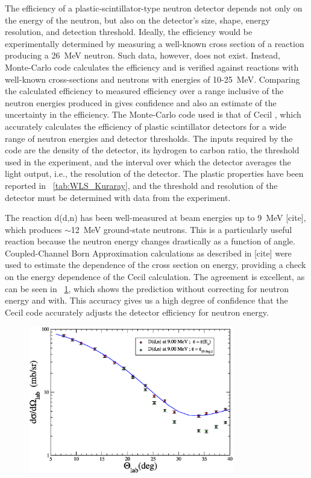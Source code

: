 The efficiency of a plastic-scintillator-type neutron detector depends not only on the energy of the neutron, but also on the detector's size, shape, energy resolution, and detection threshold.  Ideally, the efficiency would be experimentally determined by measuring a well-known cross section of a reaction producing a 26~MeV neutron.  Such data, however, does not exist.  Instead, Monte-Carlo code calculates the efficiency and is verified against reactions with well-known cross-sections and neutrons with energies of 10-25~MeV.  Comparing the calculated efficiency to measured efficiency over a range inclusive of the neutron energies produced in \reaction gives confidence and also an estimate of the uncertainty in the efficiency.  The Monte-Carlo code used is that of Cecil \cite{Cecil_neutEfficiency}, which accurately calculates the efficiency of plastic scintillator detectors for a wide range of neutron energies and detector thresholds.  The inputs required by the code are the density of the detector, its hydrogen to carbon ratio, the threshold used in the experiment, and the interval over which the detector averages the light output, i.e., the resolution of the detector.  The plastic properties have been reported in {\tab}~\ref{tab:WLS_Kuraray}, and the threshold and resolution of the detector must be determined with data from the experiment.  

The reaction d(d,n) has been well-measured at beam energies up to 9~MeV [cite], which produces $\sim$12~MeV ground-state neutrons.  This is a particularly useful reaction because the neutron energy changes drastically as a function of angle.  Coupled-Channel Born Approximation calculations as described in [cite] were used to estimate the dependence of the cross section on energy, providing a check on the energy dependence of the Cecil calculation.  The agreement is excellent, as can be seen in {\fig}~\ref{fig:DeuteriumMatch}, which shows the prediction without correcting for neutron energy and with.  This accuracy gives us a high degree of confidence that the Cecil code accurately adjusts the detector efficiency for neutron energy.  
\begin{figure}[!htbp]
\centering
\includegraphics[width=0.8\textwidth]{figures/deuteriumMatch.eps}
\caption{}
\label{fig:DeuteriumMatch}
\end{figure}

